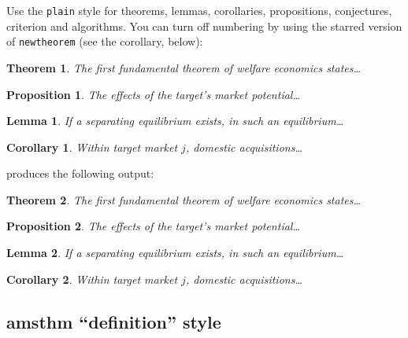\documentclass{cje}          %
\theoremstyle{plain}%
\newtheorem{theorem}{Theorem}
\newtheorem{lemma}{Lemma}
\newtheorem{proposition}{Proposition}
\newtheorem*{corollary}{Corollary}
\theoremstyle{definition}
\theoremstyle{remark}
\begin{document}
Use the \verb"plain" style for theorems, lemmas, corollaries, propositions, conjectures, criterion and algorithms. You can turn off numbering by using the starred version of  \verb"newtheorem" (see the corollary, below):
\begin{smallverbatim}
\theoremstyle{plain}%
  \newtheorem{theorem}{Theorem}
  \newtheorem{lemma}{Lemma}
  \newtheorem{proposition}{Proposition}
  \newtheorem*{corollary}{Corollary}
    
\begin{theorem}
  The first fundamental theorem of welfare economics states\ldots
\end{theorem}
\begin{proposition}
  The effects of the target's market potential\ldots
\end{proposition}
\begin{lemma}
\label{Lucas}
  If a separating equilibrium exists, in such an equilibrium\ldots
\end{lemma}
\begin{corollary}
  Within target market $j$, domestic acquisitions\ldots
\end{corollary}
\end{smallverbatim}
produces the following output:
\begin{theorem}
  The first fundamental theorem of welfare economics states\ldots
\end{theorem}
\begin{proposition}
  The effects of the target's market potential\ldots
\end{proposition}
\begin{lemma}
\label{Lucas}
  If a separating equilibrium exists, in such an equilibrium\ldots
\end{lemma}
\begin{corollary}
  Within target market $j$, domestic acquisitions\ldots
\end{corollary}

\subsection{amsthm ``definition'' style}
\label{amsdefn}
\end{document}
